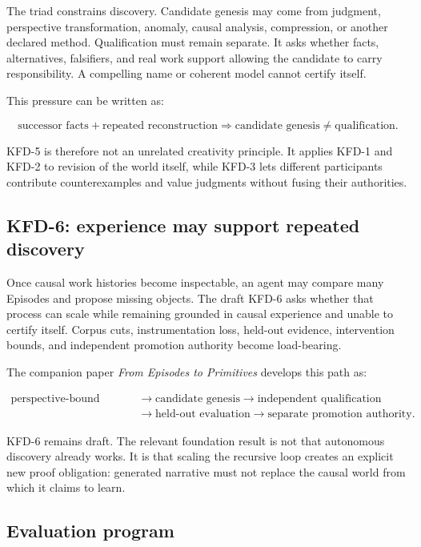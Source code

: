 The triad constrains discovery. Candidate genesis may come from judgment,
perspective transformation, anomaly, causal analysis, compression, or another
declared method. Qualification must remain separate. It asks whether facts,
alternatives, falsifiers, and real work support allowing the candidate to
carry responsibility. A compelling name or coherent model cannot certify
itself.

This pressure can be written as:

\begin{equation}
\text{successor facts} + \text{repeated reconstruction}
\Longrightarrow \text{candidate genesis} \neq \text{qualification}.
\end{equation}

KFD-5 is therefore not an unrelated creativity principle. It applies KFD-1
and KFD-2 to revision of the world itself, while KFD-3 lets different
participants contribute counterexamples and value judgments without fusing
their authorities.

\subsection{KFD-6: experience may support repeated discovery}

Once causal work histories become inspectable, an agent may compare many
Episodes and propose missing objects. The draft KFD-6 asks whether that
process can scale while remaining grounded in causal experience and unable to
certify itself. Corpus cuts, instrumentation loss, held-out evidence,
intervention bounds, and independent promotion authority become load-bearing.

The companion paper \emph{From Episodes to Primitives} develops this path
\cite{episodesPaper2026} as:

\begin{align}
\text{perspective-bound replay}
&\rightarrow \text{candidate genesis}
\rightarrow \text{independent qualification} \nonumber \\
&\rightarrow \text{held-out evaluation}
\rightarrow \text{separate promotion authority}.
\end{align}

KFD-6 remains draft. The relevant foundation result is not that autonomous
discovery already works. It is that scaling the recursive loop creates an
explicit new proof obligation: generated narrative must not replace the
causal world from which it claims to learn.

\subsection{Evaluation program}

